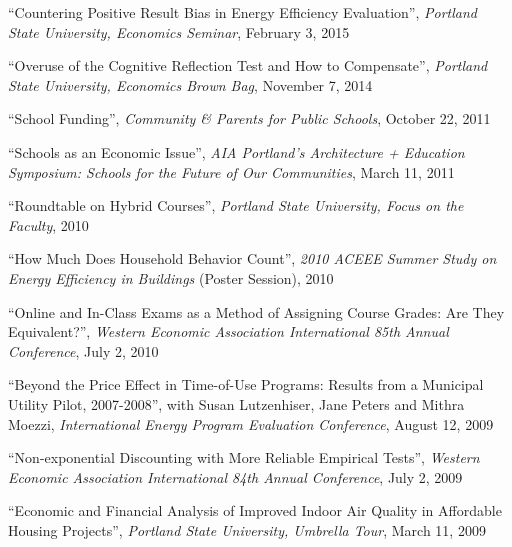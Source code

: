 \documentclass[Computer Science]{vita}
\begin{document}
\begin{vita}
\begin{Publications}
\begin{Work in progress}
    \end{Work in progress}

  \end{Publications}

  \begin{Presentations and Invited Talks}
  
  \item ``Countering Positive Result Bias in Energy Efficiency Evaluation'', \emph{Portland State University, Economics Seminar}, February 3, 2015
  
  \item ``Overuse of the Cognitive Reflection Test and How to Compensate'', \emph{Portland State University, Economics Brown Bag}, November 7, 2014
  
  \item ``School Funding'', \emph{Community \& Parents for Public Schools}, October 22, 2011
  
\item ``Schools as an Economic Issue'', \emph{AIA Portland's Architecture + Education Symposium: Schools for the Future of Our Communities}, March 11, 2011

\item ``Roundtable on Hybrid Courses'', \emph{Portland State University, Focus on the Faculty}, 2010

  \item ``How Much Does Household Behavior Count'', \emph{2010 ACEEE
      Summer Study on Energy Efficiency in Buildings} (Poster
    Session), 2010
	  
  \item ``Online and In-Class Exams as a Method of Assigning Course
    Grades: Are They Equivalent?'', \emph{Western Economic Association
      International 85th Annual Conference}, July 2, 2010

  \item ``Beyond the Price Effect in Time-of-Use Programs: Results
    from a Municipal Utility Pilot, 2007-2008'', with Susan
    Lutzenhiser, Jane Peters and Mithra Moezzi, \emph{International
      Energy Program Evaluation Conference}, August 12, 2009

  \item ``Non-exponential Discounting with More Reliable Empirical
    Tests'', \emph{Western Economic Association International 84th
      Annual Conference}, July 2, 2009

  \item ``Economic and Financial Analysis of Improved Indoor Air
    Quality in Affordable Housing Projects'', \emph{Portland State
      University, Umbrella Tour}, March 11, 2009


\end{Presentations and Invited Talks}
\end{vita}
\end{document}
